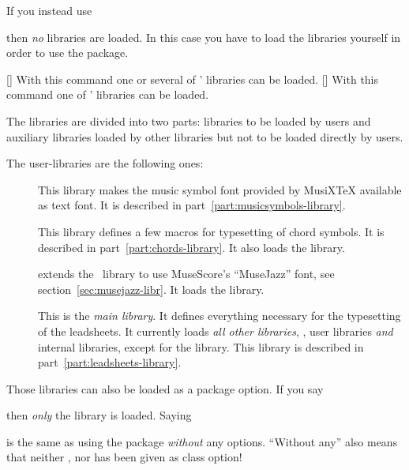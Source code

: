 \documentclass[load-preamble+]{cnltx-doc}
\def\library*#1{``#1''}%
\begin{document}
If you instead use
\begin{sourcecode}
  \usepackage[minimal]{leadsheets}
\end{sourcecode}
then \emph{no} libraries are loaded.  In this case you have to load the
libraries yourself in order to use the package.
\begin{commands}
  []
    With this command one or several of \leadsheets' libraries can be loaded.
  []
    With this command one of \leadsheets' libraries can be loaded.
\end{commands}

The libraries are divided into two parts: libraries to be loaded by users and
auxiliary libraries loaded by other libraries but not to be loaded directly by
users.

The user-libraries are the following ones:
\begin{description}
  \item[] This library makes
    the music symbol font provided by MusiX\TeX{} available as text font.  It
    is described in part~\ref{part:musicsymbols-library}.
  \item[] This library defines a
    few macros for typesetting of chord symbols.  It is described in
    part~\ref{part:chords-library}.  It also loads the
    library.
  \item[] extends the \chords\
    library to use MuseScore's \enquote{MuseJazz} font, see
    section~\ref{sec:musejazz-libr}.  It loads the 
    library.
  \item[]  This is the \emph{main
    library}.  It defines everything necessary for the typesetting of the
    leadsheets.  It currently loads \emph{all other libraries}, \ie, user
    libraries \emph{and} internal libraries, except for the 
    library.  This library is described in part~\ref{part:leadsheets-library}.
\end{description}
Those libraries can also be loaded as a package option.  If you say
\begin{sourcecode}
  \usepackage[musicsymbols]{leadsheets}
\end{sourcecode}
then \emph{only} the  library is loaded.  Saying
\begin{sourcecode}
  \usepackage[songs]{leadsheets}
\end{sourcecode}
is the same as using the package \emph{without} any options.  ``Without any''
also means that neither \library{musicsymbols}, \library{chords} nor
\library{songs} has been given as class option!
\end{document}

